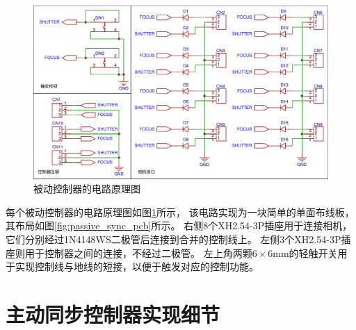 \begin{figure}
    \includegraphics[width=\textwidth]{figures/passive_sync_schematic}
    \caption{被动控制器的电路原理图}
    \label{fig:passive_sync_schematic}
\end{figure}
每个被动控制器的电路原理图如图\ref{fig:passive_sync_schematic}所示，
该电路实现为一块简单的单面布线板，其布局如图\ref{fig:passive_sync_pcb}所示。
右侧8个XH2.54-3P插座用于连接相机，它们分别经过1N4148WS二极管后连接到合并的控制线上。
左侧3个XH2.54-3P插座则用于控制器之间的连接，不经过二极管。
左上角两颗$6\times 6$mm的轻触开关用于实现控制线与地线的短接，以便于触发对应的控制功能。


\chapter{主动同步控制器实现细节}

